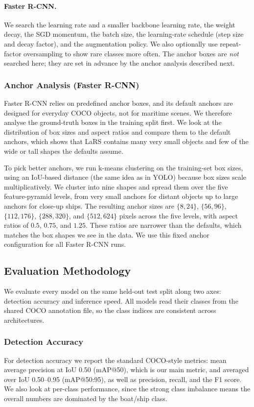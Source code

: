 \documentclass[11pt,a4paper]{article}
\begin{document}
\paragraph{Faster R-CNN.}
We search the learning rate and a smaller backbone learning rate, the weight
decay, the SGD momentum, the batch size, the learning-rate schedule (step size
and decay factor), and the augmentation policy. We also optionally use
repeat-factor oversampling to show rare classes more often. The anchor boxes are
\emph{not} searched here; they are set in advance by the anchor analysis
described next.

\subsubsection{Anchor Analysis (Faster R-CNN)}
Faster R-CNN relies on predefined anchor boxes, and its default anchors are
designed for everyday COCO objects, not for maritime scenes. We therefore analyse
the ground-truth boxes in the training split first. We look at the distribution
of box sizes and aspect ratios and compare them to the default anchors, which
shows that LaRS contains many very small objects and few of the wide or tall
shapes the defaults assume.

To pick better anchors, we run k-means clustering on the training-set box sizes,
using an IoU-based distance (the same idea as in YOLO) because box sizes scale
multiplicatively. We cluster into nine shapes and spread them over the five
feature-pyramid levels, from very small anchors for distant objects up to large
anchors for close-up ships. The resulting anchor sizes are
$\{8, 24\}$, $\{56, 96\}$, $\{112, 176\}$, $\{288, 320\}$, and $\{512, 624\}$
pixels across the five levels, with aspect ratios of $0.5$, $0.75$, and $1.25$.
These ratios are narrower than the defaults, which matches the box shapes we see
in the data. We use this fixed anchor configuration for all Faster R-CNN runs.

\subsection{Evaluation Methodology}
We evaluate every model on the same held-out test split along two axes:
detection accuracy and inference speed. All models read their classes from the
shared COCO annotation file, so the class indices are consistent across
architectures.

\subsubsection{Detection Accuracy}
For detection accuracy we report the standard COCO-style metrics: mean average
precision at IoU 0.50 (mAP@50), which is our main metric, and averaged over IoU 0.50--0.95 (mAP@50:95), as
well as precision, recall, and the F1 score. We also look at per-class
performance, since the strong class imbalance means the overall numbers are
dominated by the boat/ship class.
\end{document}
